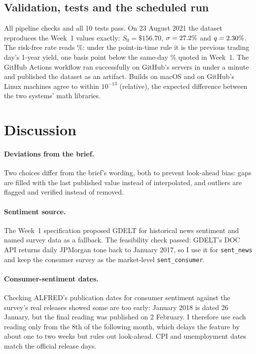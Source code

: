 \documentclass[11pt]{article}
\newcommand{\code}[1]{\texttt{#1}}
\begin{document}
\subsection{Validation, tests and the scheduled run}
All \wChecks{} pipeline checks and all 10 tests pass. On 23 August 2021 the dataset reproduces the Week~1 values exactly:
$S_0=\$156.70$, $\sigma=27.2\%$ and $q=2.30\%$. The risk-free rate reads \wAnchorr\%: under the
point-in-time rule it is the previous trading day's 1-year yield, one basis point below the same-day \wAnchorrsameday\%
quoted in Week~1. The GitHub Actions workflow ran successfully on GitHub's servers in under a minute and published the
dataset as an artifact. Builds on macOS and on GitHub's Linux machines agree to within $10^{-13}$ (relative), the
expected difference between the two systems' math libraries.

\section{Discussion}
\paragraph{Deviations from the brief.} Two choices differ from the brief's wording, both to prevent look-ahead bias:
gaps are filled with the last published value instead of interpolated, and outliers are flagged and verified instead
of removed.

\paragraph{Sentiment source.} The Week~1 specification proposed GDELT for historical news sentiment and named survey
data as a fallback. The feasibility check passed: GDELT's DOC API returns daily JPMorgan tone back to January 2017, so I
use it for \code{sent\_news} and keep the consumer survey as the market-level \code{sent\_consumer}.

\paragraph{Consumer-sentiment dates.}\label{sec:umcsent} Checking ALFRED's publication dates for consumer sentiment against
the survey's real releases showed some are too early: January 2018 is dated 26 January, but the final reading was
published on 2 February. I therefore use each reading only from the 8th of the following month, which delays the feature
by about one to two weeks but rules out look-ahead. CPI and unemployment dates match the official release days.
\end{document}
